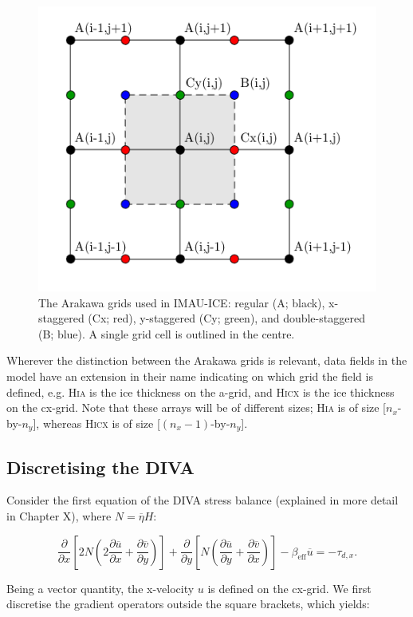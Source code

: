 \documentclass{article}
\begin{document}
\begin{figure}[H]
  \includegraphics[width=0.5\linewidth]{Fig_IMAUICE_grids.png}
  \caption{The Arakawa grids used in IMAU-ICE: regular (A; black), x-staggered (Cx; red), y-staggered (Cy; green), and double-staggered (B; blue). A single grid cell is outlined in the centre.}
\end{figure}

Wherever the distinction between the Arakawa grids is relevant, data fields in the model have an extension in their name indicating on which grid the field is defined, e.g. \textsc{Hi\textunderscore a} is the ice thickness on the a-grid, and \textsc{Hi\textunderscore cx} is the ice thickness on the cx-grid. Note that these arrays will be of different sizes; \textsc{Hi\textunderscore a} is of size [$n_x$-by-$n_y$], whereas \textsc{Hi\textunderscore cx} is of size [$\left( n_x - 1 \right)$-by-$n_y$].

\subsection{Discretising the DIVA}

Consider the first equation of the DIVA stress balance (explained in more detail in Chapter X), where $N = \overline{\eta} H$:

\begin{equation}\label{eq:DIVA_disc_01}
\frac{\partial}{\partial x} \left[ 2 N \left( 2 \frac{\partial \overline{u}}{\partial x} + 
\frac{\partial \overline{v}}{\partial y} \right) \right] + 
\frac{\partial}{\partial y} \left[ N \left( \frac{\partial \overline{u}}{\partial y} + 
\frac{\partial \overline{v}}{\partial x} \right) \right] - \beta_{\textrm{eff}} \overline{u} = -\tau_{d,x}.
\end{equation}

Being a vector quantity, the x-velocity $u$ is defined on the cx-grid. We first discretise the gradient operators outside the square brackets, which yields:
\end{document}
